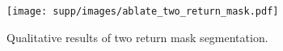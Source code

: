 \begin{figure}[t]
\centering
\texttt{[image: supp/images/ablate\_two\_return\_mask.pdf]}

\caption{Qualitative results of two return mask segmentation.}
\label{fig:supp_ablate_two_return_mask}

\end{figure}